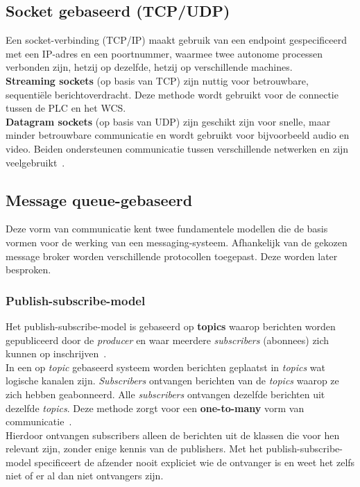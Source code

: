 \subsection{Socket gebaseerd (TCP/UDP)}
Een socket-verbinding (TCP/IP) maakt gebruik van een endpoint gespecificeerd met een IP-adres en een poortnummer, 
waarmee twee autonome processen verbonden zijn, hetzij op dezelfde, hetzij op verschillende machines.
\\
\textbf{Streaming sockets} (op basis van TCP) zijn nuttig voor betrouwbare, sequentiële berichtoverdracht.
Deze methode wordt gebruikt voor de connectie tussen de PLC en het WCS.
\\ 
\textbf{Datagram sockets} (op basis van UDP) zijn geschikt zijn voor snelle, maar minder betrouwbare communicatie en wordt gebruikt voor bijvoorbeeld audio en video.
Beiden ondersteunen communicatie tussen verschillende netwerken en zijn veelgebruikt~\autocite{Dinari2020}.

\subsection{Message queue-gebaseerd}
Deze vorm van communicatie kent twee fundamentele modellen die de basis vormen voor de werking van een messaging-systeem. 
Afhankelijk van de gekozen message broker worden verschillende protocollen toegepast. 
Deze worden later besproken.

\subsubsection{Publish-subscribe-model}
Het publish-subscribe-model is gebaseerd op \textbf{topics} waarop berichten worden gepubliceerd door de \emph{producer} 
en waar meerdere \emph{subscribers} (abonnees) zich kunnen op inschrijven~\autocite{Dinari2020}. 
\\
In een op \emph{topic} gebaseerd systeem worden berichten geplaatst in \emph{topics} wat logische kanalen zijn.
\emph{Subscribers} ontvangen berichten van de \emph{topics} waarop ze zich hebben geabonneerd.
Alle \emph{subscribers} ontvangen dezelfde berichten uit dezelfde \emph{topics}. 
Deze methode zorgt voor een \textbf{one-to-many} vorm van communicatie~\autocite{Dinari2020}.
\\
Hierdoor ontvangen subscribers alleen de berichten uit de klassen die voor hen relevant zijn, zonder enige kennis van de publishers. 
Met het publish-subscribe-model specificeert de afzender nooit expliciet wie de ontvanger is en weet het zelfs niet of er al dan niet ontvangers zijn.

